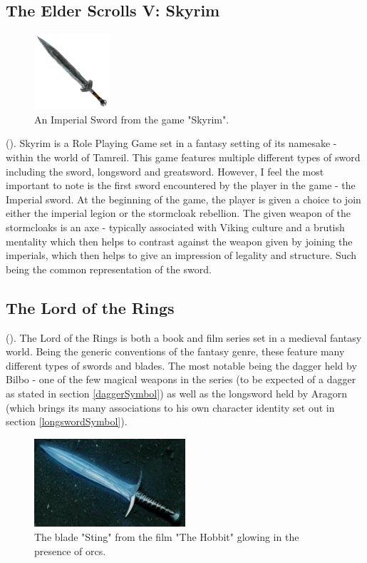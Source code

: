 \documentclass{article}
\begin{document}
\subsection{The Elder Scrolls V: Skyrim}
\begin{figure}
    \centering
    \includegraphics[width=0.25\textwidth]{ImperialSword.png}
    \caption{\parencite{imperialSword} An Imperial Sword from the game "Skyrim".
    }
    \label{fig:ImperialSword}
\end{figure}
().
Skyrim is a Role Playing Game set in a fantasy setting of its namesake - within the world of Tamreil. This game features multiple different types of sword including the sword, longsword and greatsword. However, I feel the most important to note is the first sword encountered by the player in the game - the Imperial sword. At the beginning of the game, the player is given a choice to join either the imperial legion or the stormcloak rebellion. The given weapon of the stormcloaks is an axe - typically associated with Viking culture and a brutish mentality which then helps to contrast against the weapon given by joining the imperials, which then helps to give an impression of legality and structure. Such being the common representation of the sword.

\subsection{The Lord of the Rings}

().
The Lord of the Rings is both a book and film series set in a medieval fantasy world. Being the generic conventions of the fantasy genre, these feature many different types of swords and blades. The most notable being the dagger held by Bilbo - one of the few magical weapons in the series (to be expected of a dagger as stated in section \ref{daggerSymbol}) as well as the longsword held by Aragorn (which brings its many associations to his own character identity set out in section \ref{longswordSymbol}).

\begin{figure}[h]
    \centering
    \caption{\parencite{Sting} The blade "Sting" from the film "The Hobbit" glowing in the presence of orcs.}
    \label{fig:Sting}
    \includegraphics[width=0.5\textwidth]{Sting.png}
\end{figure}
\end{document}
